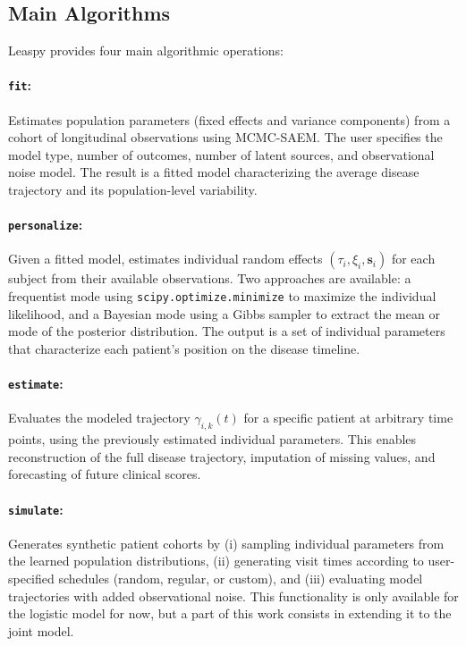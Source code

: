 \documentclass{rapportCS}
\begin{document}
\subsection{Main Algorithms}

Leaspy provides four main algorithmic operations:
\vspace*{-0.4cm}
\paragraph{\texttt{fit}:} Estimates population parameters (fixed effects and variance components) from a cohort of longitudinal observations using MCMC-SAEM. The user specifies the model type, number of outcomes, number of latent sources, and observational noise model. The result is a fitted model characterizing the average disease trajectory and its population-level variability.
\vspace*{-0.4cm}
\paragraph{\texttt{personalize}:} Given a fitted model, estimates individual random effects $(\tau_i, \xi_i, \mathbf{s}_i)$ for each subject from their available observations. Two approaches are available: a frequentist mode using \texttt{scipy.optimize.minimize} to maximize the individual likelihood, and a Bayesian mode using a Gibbs sampler to extract the mean or mode of the posterior distribution. The output is a set of individual parameters that characterize each patient's position on the disease timeline.
\vspace*{-0.4cm}
\paragraph{\texttt{estimate}:} Evaluates the modeled trajectory $\gamma_{i,k}(t)$ for a specific patient at arbitrary time points, using the previously estimated individual parameters. This enables reconstruction of the full disease trajectory, imputation of missing values, and forecasting of future clinical scores.
\vspace*{-0.4cm}
\paragraph{\texttt{simulate}:} Generates synthetic patient cohorts by (i) sampling individual parameters from the learned population distributions, (ii) generating visit times according to user-specified schedules (random, regular, or custom), and (iii) evaluating model trajectories with added observational noise. This functionality is only available for the logistic model for now, but a part of this work consists in extending it to the joint model.
\end{document}
